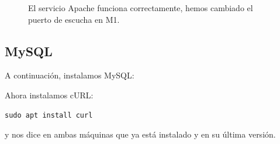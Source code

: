 \documentclass{article}
\begin{document}
\begin{figure}[H]
	\centering
	\caption{El servicio Apache funciona correctamente, hemos cambiado el puerto de escucha en M1.}
	\label{fig:apache-page}
\end{figure}

\subsection{MySQL}

A continuación, instalamos MySQL:



Ahora instalamos cURL:

\begin{verbatim}
sudo apt install curl
\end{verbatim}

y nos dice en ambas máquinas que ya está instalado y en su última versión.
\end{document}

